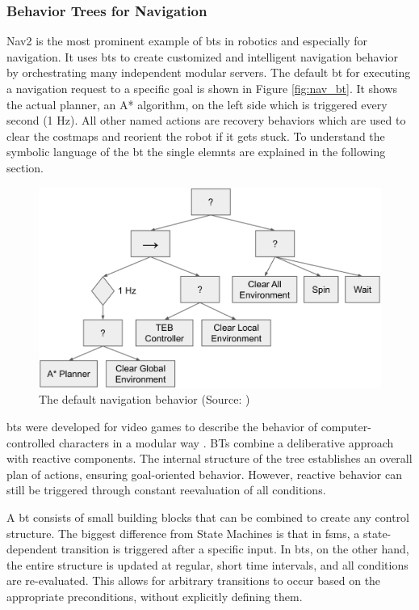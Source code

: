 \subsubsection{Behavior Trees for Navigation}

Nav2 is the most prominent example of \glspl{bt} in robotics and especially for navigation. It uses \glspl{bt} to create customized and intelligent navigation behavior by orchestrating many independent modular servers. The default \gls{bt} for executing a navigation request to a specific goal is shown in Figure \ref{fig:nav_bt}. It shows the actual planner, an A* algorithm, on the left side which is triggered every second (1 Hz). All other named actions are recovery behaviors which are used to clear the costmaps and reorient the robot if it gets stuck. To understand the symbolic language of the \gls{bt} the single elemnts are explained in the following section.

\begin{figure}[h]
    \centering
    \includegraphics[width=\textwidth]{figures/02_state_of_the_art/nav2_bt.png}
    \caption{The default navigation behavior (Source: \cite{Marathon})}
    \label{fig:nav2_bt}
\end{figure}

\Glspl{bt} were developed for video games to describe the behavior of computer-controlled characters in a modular way \cite{Limetal.,2010}. BTs combine a deliberative approach with reactive components. The internal structure of the tree establishes an overall plan of actions, ensuring goal-oriented behavior. However, reactive behavior can still be triggered through constant reevaluation of all conditions. 

A \gls{bt} consists of small building blocks that can be combined to create any control structure. The biggest difference from State Machines is that in \glspl{fsm}, a state-dependent transition is triggered after a specific input. In \glspl{bt}, on the other hand, the entire structure is updated at regular, short time intervals, and all conditions are re-evaluated. This allows for arbitrary transitions to occur based on the appropriate preconditions, without explicitly defining them.

